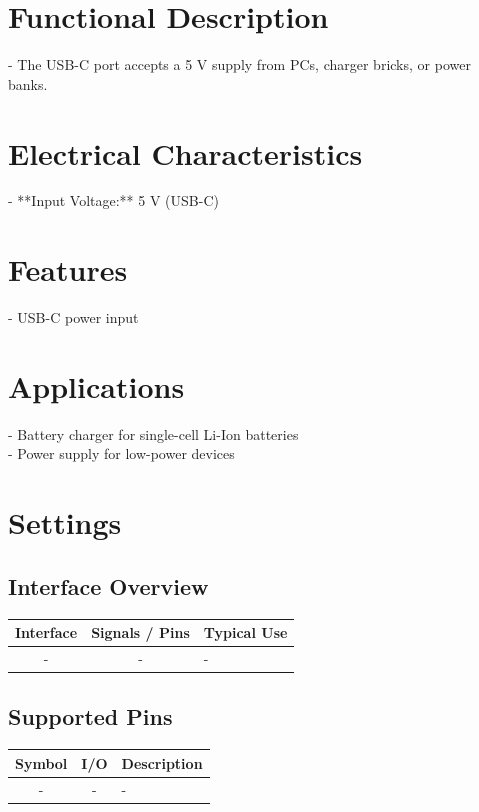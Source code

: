 \documentclass[10pt]{article}
\begin{document}
\section*{Functional Description}
- The USB-C port accepts a 5 V supply from PCs, charger bricks, or power banks.\\ 

\section*{Electrical Characteristics}
- **Input Voltage:** 5 V (USB-C)\\ 

\section*{Features}
- USB-C power input\\ 



\section*{Applications}
- Battery charger for single-cell Li-Ion batteries\\ 
- Power supply for low-power devices\\ 

\vspace{1em}



\section*{Settings}

\subsection*{Interface Overview}
\begin{tabularx}{\textwidth}{|c|c|>{\RaggedRight\arraybackslash}X|}
\hline
\rowcolor{headergray}
Interface & Signals / Pins & Typical Use \\
\hline
- & - & - \\
\hline
\end{tabularx}


\subsection*{Supported Pins}
\begin{tabularx}{\textwidth}{|c|c|>{\RaggedRight\arraybackslash}X|}
\hline
\rowcolor{headergray}
Symbol & I/O & Description \\
\hline
- & - & - \\
\hline
\end{tabularx}
\end{document}
